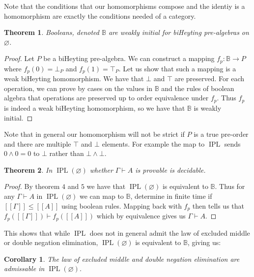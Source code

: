 \documentclass[12pt]{article}
\newtheorem{theorem}{Theorem}
\newtheorem{corollary}{Corollary}
\newcommand{\B}{\mathbb{B}}
\newcommand*{\mtset}{\ensuremath{\varnothing}}
\DeclareMathOperator{\IPL}{IPL}
\begin{document}
\noindent Note that the conditions that our homomorphisms compose and the identiy is a homomorphism are exactly the conditions needed of a category.

\begin{theorem}
    Booleans, denoted $\B$ are weakly initial for biHeyting pre-algebras on $\mtset$.
\end{theorem}
\begin{proof}
    Let $P$ be a biHeyting pre-algebra. We can construct a mapping $f_p: \B \to P$ where $f_p(0) = \bot_P$ and $f_p(1) = \top_P$. Let us show that such a mapping is a weak biHeyting homomorphism. We have that $\bot$ and $\top$ are preserved. For each operation, we can prove by cases on the values in $\B$ and the rules of boolean algebra that operations are preserved up to order equivalence under $f_p$. Thus $f_p$ is indeed a weak biHeyting homomorphism, so we have that $\B$ is weakly initial. 
\end{proof}

\noindent Note that in general our homomorphism will not be strict if $P$ is a true pre-order and there are multiple $\top$ and $\bot$ elements. For example the map to $\IPL$ sends $0 \land 0 = 0$ to $\bot$ rather than $\bot \land \bot$.

\begin{theorem}
    In $\IPL(\mtset)$ whether $\Gamma \vdash A$ is provable is decidable. 
\end{theorem}
\begin{proof}
    By theorem $4$ and $5$ we have that $\IPL(\mtset)$ is equivalent to $\B$. Thus for any $\Gamma \vdash A$ in $\IPL(\mtset)$ we can map to $\B$, determine in finite time if $[[\Gamma]] \le [[A]]$ using boolean rules. Mapping back with $f_p$ then tells us that $f_p([[\Gamma]]) \vdash f_p([[A]])$ which by equivalence gives us $\Gamma \vdash A$.
\end{proof}

\noindent This shows that while $\IPL$ does not in general admit the law of excluded middle or double negation elimination, $\IPL(\mtset)$ is equivalent to $\B$, giving us:

\begin{corollary}
    The law of excluded middle and double negation elimination are admissable in $\IPL(\mtset)$.
\end{corollary}
\end{document}
